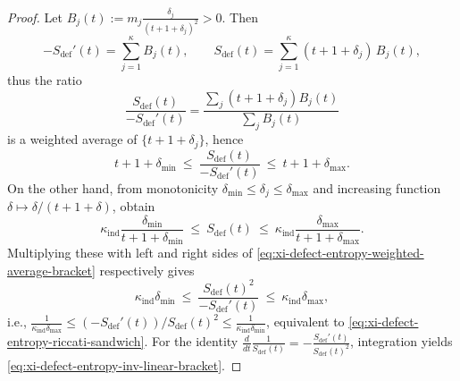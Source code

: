 \begin{proof}
Let
\(
B_j(t):=m_j\frac{\delta_j}{(t+1+\delta_j)^2}>0
\).
Then
\[
-S_{\mathrm{def}}'(t)=\sum_{j=1}^{\kappa}B_j(t),
\qquad
S_{\mathrm{def}}(t)=\sum_{j=1}^{\kappa}(t+1+\delta_j)\,B_j(t),
\]
thus the ratio
\[
\frac{S_{\mathrm{def}}(t)}{-S_{\mathrm{def}}'(t)}
=\frac{\sum_j (t+1+\delta_j)B_j(t)}{\sum_j B_j(t)}
\]
is a weighted average of \(\{t+1+\delta_j\}\), hence
\begin{equation}\label{eq:xi-defect-entropy-weighted-average-bracket}
t+1+\delta_{\min}
\ \le\
\frac{S_{\mathrm{def}}(t)}{-S_{\mathrm{def}}'(t)}
\ \le\
t+1+\delta_{\max}.
\end{equation}
On the other hand, from monotonicity \(\delta_{\min}\le \delta_j\le \delta_{\max}\) and increasing function \(\delta\mapsto \delta/(t+1+\delta)\), obtain
\[
\kappa_{\mathrm{ind}}\frac{\delta_{\min}}{t+1+\delta_{\min}}
\ \le\
S_{\mathrm{def}}(t)
\ \le\
\kappa_{\mathrm{ind}}\frac{\delta_{\max}}{t+1+\delta_{\max}}.
\]
Multiplying these with left and right sides of \eqref{eq:xi-defect-entropy-weighted-average-bracket} respectively gives
\[
\kappa_{\mathrm{ind}}\delta_{\min}
\ \le\
\frac{S_{\mathrm{def}}(t)^2}{-S_{\mathrm{def}}'(t)}
\ \le\
\kappa_{\mathrm{ind}}\delta_{\max},
\]
i.e.,
\(
\frac{1}{\kappa_{\mathrm{ind}}\delta_{\max}}
\le
(-S_{\mathrm{def}}'(t))/S_{\mathrm{def}}(t)^2
\le
\frac{1}{\kappa_{\mathrm{ind}}\delta_{\min}}
\), equivalent to \eqref{eq:xi-defect-entropy-riccati-sandwich}.
For the identity
\(
\frac{d}{dt}\frac{1}{S_{\mathrm{def}}(t)}=-\frac{S_{\mathrm{def}}'(t)}{S_{\mathrm{def}}(t)^2}
\),
integration yields \eqref{eq:xi-defect-entropy-inv-linear-bracket}.
\end{proof}
\endinput




